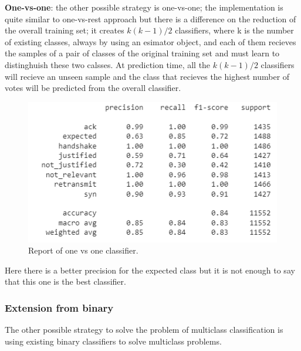 \documentclass[sigconf]{acmart}
\begin{document}
    \textbf{One-vs-one}: the other possible strategy is one-vs-one; the implementation is quite similar to one-vs-rest approach but there is a difference on the reduction of the overall training set; it creates \(k (k-1)/2\) classifiers, where k is the number of existing classes, always by using an esimator object, and each of them recieves the samples of a pair of classes of the original training set and must learn to distinghuish these two calsses. At prediction time, all the \(k (k-1)/2\) classifiers will recieve an unseen sample and the class that recieves the highest number of votes will be predicted from the overall classifier.
    \begin{figure}[h!]
        \includegraphics[width=\linewidth]{img/one_vs_one_classifier.png}
        \caption{Report of one vs one classifier.}
        \label{fig:one_vs_one_classifier}
    \end{figure}
    Here there is a better precision for the expected class but it is not enough to say that this one is the best classifier.

    \subsubsection{Extension from binary}
    The other possible strategy to solve the problem of multiclass classification is using existing binary classifiers to solve multiclass problems.
\end{document}
